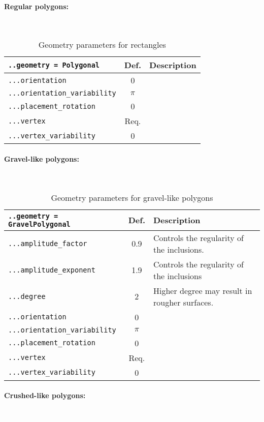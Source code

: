 \documentclass[10pt]{article}
\newcommand{\whiteline}{\textcolor{white}{.\\}}
\begin{document}
\paragraph{Regular polygons:} \whiteline

\begin{table}[h!]
\begin{tabularx}{\textwidth}{lcX}
\verb+..geometry = Polygonal+ & Def. & Description\\
\hline
\verb+...orientation+ & 0 & \\
\verb+...orientation_variability+ & $\pi$ & \\
\verb+...placement_rotation+ & 0 & \\
\verb+...vertex+ &  Req. & \\
\verb+...vertex_variability+ & 0 & \\
\hline
\end{tabularx}
\caption{Geometry parameters for rectangles}
\end{table}

\paragraph{Gravel-like polygons:} \whiteline

\begin{table}[h!]
\begin{tabularx}{\textwidth}{lcX}
\verb+..geometry = GravelPolygonal+ & Def. & Description\\
\hline
\verb+...amplitude_factor+ & 0.9 & Controls the regularity of the inclusions. \\
\verb+...amplitude_exponent+ & 1.9 & Controls the regularity of the inclusions \\
\verb+...degree+ & 2 & Higher degree may result in rougher surfaces. \\
\verb+...orientation+ & 0 & \\
\verb+...orientation_variability+ & $\pi$ & \\
\verb+...placement_rotation+ & 0 & \\
\verb+...vertex+ &  Req. & \\
\verb+...vertex_variability+ & 0 & \\
\hline
\end{tabularx}
\caption{Geometry parameters for gravel-like polygons}
\end{table}

\eject

\paragraph{Crushed-like polygons:} \whiteline
\end{document}
